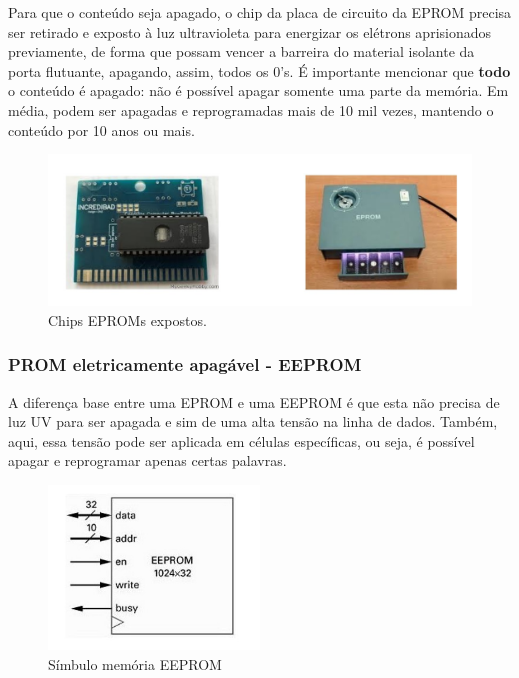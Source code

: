 \documentclass{article}
\begin{document}
Para que o conteúdo seja apagado, o chip da placa de circuito da EPROM precisa ser retirado e exposto à luz ultravioleta para energizar os elétrons aprisionados previamente, de forma que possam vencer a barreira do material isolante da porta flutuante, apagando, assim, todos os $0$'s. É importante mencionar que \textbf{todo} o conteúdo é apagado: não é possível apagar somente uma parte da memória. Em média, podem ser apagadas e reprogramadas mais de 10 mil vezes, mantendo o conteúdo por 10 anos ou mais.

\begin{figure}[h!] 
    \centering 
    \includegraphics[width=1\textwidth]{EPROMS.jpg}
    \caption{Chips EPROMs expostos.} 
    \label{fig:EPROMExposto} 
\end{figure}

\subsubsection{PROM eletricamente apagável - EEPROM}
A diferença base entre uma EPROM e uma EEPROM é que esta não precisa de luz UV para ser apagada e sim de uma alta tensão na linha de dados. Também, aqui, essa tensão pode ser aplicada em células específicas, ou seja, é possível apagar e reprogramar apenas certas palavras.
\begin{figure}[h!] 
    \centering 
    \includegraphics[width=0.5\textwidth]{EEPROM.jpg}
    \caption{Símbulo memória EEPROM} 
    \label{fig:EEProm} 
\end{figure}
\end{document}

